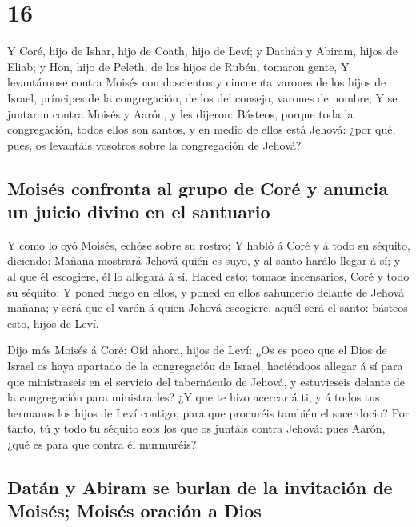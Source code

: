 \hypertarget{section-04-16}{%
\section{16}\label{section-04-16}}

 Y Coré, hijo de Ishar, hijo de Coath, hijo de Leví; y
Dathán y Abiram, hijos de Eliab; y Hon, hijo de Peleth, de los hijos de
Rubén, tomaron gente,  Y levantáronse contra Moisés con
doscientos y cincuenta varones de los hijos de Israel, príncipes de la
congregación, de los del consejo, varones de nombre;  Y se
juntaron contra Moisés y Aarón, y les dijeron: Básteos, porque toda la
congregación, todos ellos son santos, y en medio de ellos está Jehová:
¿por qué, pues, os levantáis vosotros sobre la congregación de Jehová?

\hypertarget{moisuxe9s-confronta-al-grupo-de-coruxe9-y-anuncia-un-juicio-divino-en-el-santuario}{%
\subsection{Moisés confronta al grupo de Coré y anuncia un juicio divino
en el
santuario}\label{moisuxe9s-confronta-al-grupo-de-coruxe9-y-anuncia-un-juicio-divino-en-el-santuario}}

 Y como lo oyó Moisés, echóse sobre su rostro;
 Y habló á Coré y á todo su séquito, diciendo: Mañana
mostrará Jehová quién es suyo, y al santo harálo llegar á sí; y al que
él escogiere, él lo allegará á sí.  Haced esto: tomaos
incensarios, Coré y todo su séquito:  Y poned fuego en
ellos, y poned en ellos sahumerio delante de Jehová mañana; y será que
el varón á quien Jehová escogiere, aquél será el santo: básteos esto,
hijos de Leví.

 Dijo más Moisés á Coré: Oid ahora, hijos de Leví:
 ¿Os es poco que el Dios de Israel os haya apartado de la
congregación de Israel, haciéndoos allegar á sí para que ministraseis en
el servicio del tabernáculo de Jehová, y estuvieseis delante de la
congregación para ministrarles?  ¿Y que te hizo acercar á
ti, y á todos tus hermanos los hijos de Leví contigo; para que procuréis
también el sacerdocio?  Por tanto, tú y todo tu séquito
sois los que os juntáis contra Jehová: pues Aarón, ¿qué es para que
contra él murmuréis?

\hypertarget{datuxe1n-y-abiram-se-burlan-de-la-invitaciuxf3n-de-moisuxe9s-moisuxe9s-oraciuxf3n-a-dios}{%
\subsection{Datán y Abiram se burlan de la invitación de Moisés; Moisés
oración a
Dios}\label{datuxe1n-y-abiram-se-burlan-de-la-invitaciuxf3n-de-moisuxe9s-moisuxe9s-oraciuxf3n-a-dios}}

